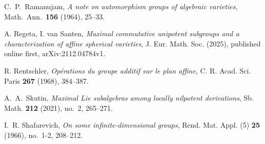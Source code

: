 \documentclass[12pt,a4paper]{amsart}
\theoremstyle{plain}
\theoremstyle{definition}
\theoremstyle{remark}
\begin{document}
\begin{thebibliography}{}
         
   
       C.~P.~Ramanujam, \emph{A note on automorphism groups of algebraic varieties},
      Math.\ Ann.\ \textbf{156} (1964), 25--33.
   
    A. Regeta, I. van Santen, \emph{Maximal commutative unipotent subgroups and a characterization of affine spherical varieties}, J. Eur. Math. Soc. (2025), published online first, arXiv:2112.04784v1.
   
    R. Rentschler, \emph{Op\'erations du groupe additif sur le plan affine}, C. R. Acad. Sci. Paris \textbf{267} (1968), 384--387.
   
   
      A.~A.~Skutin, \emph{Maximal Lie subalgebras among locally nilpotent derivations}, Sb. Math. \textbf{212} (2021), no.~2, 265--271.
   
      I.~R. Shafarevich, \emph{On some infinite-dimensional groups}, Rend. Mat. Appl. (5) \textbf{25} (1966), no.~1-2, 208--212.
   


      
   
   \end{thebibliography}
   
   
\end{document}
